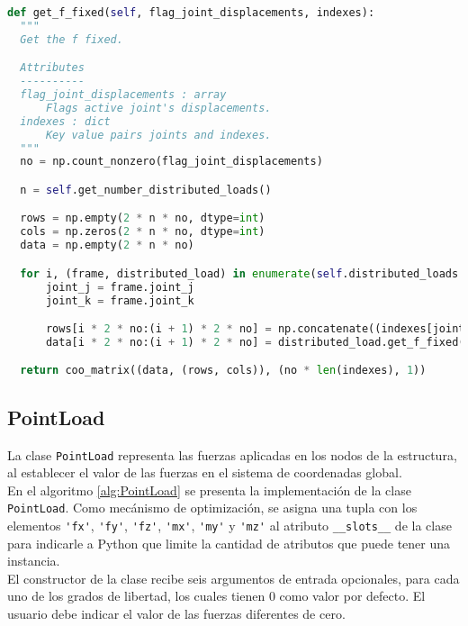 \begin{lstlisting}[language=Python,caption=Método \texttt{get\_f\_fixed()} de la clase \texttt{LoadPattern}.,label=alg:LoadPattern-get_f_fixed, frame=single]
def get_f_fixed(self, flag_joint_displacements, indexes):
  """
  Get the f fixed.

  Attributes
  ----------
  flag_joint_displacements : array
      Flags active joint's displacements.
  indexes : dict
      Key value pairs joints and indexes.
  """
  no = np.count_nonzero(flag_joint_displacements)

  n = self.get_number_distributed_loads()

  rows = np.empty(2 * n * no, dtype=int)
  cols = np.zeros(2 * n * no, dtype=int)
  data = np.empty(2 * n * no)

  for i, (frame, distributed_load) in enumerate(self.distributed_loads.items()):
      joint_j = frame.joint_j
      joint_k = frame.joint_k

      rows[i * 2 * no:(i + 1) * 2 * no] = np.concatenate((indexes[joint_j], indexes[joint_k]))
      data[i * 2 * no:(i + 1) * 2 * no] = distributed_load.get_f_fixed(flag_joint_displacements, frame)

  return coo_matrix((data, (rows, cols)), (no * len(indexes), 1))
\end{lstlisting}

\subsection{PointLoad}

La clase \verb|PointLoad| representa las fuerzas aplicadas en los nodos de la estructura, al establecer el valor de las fuerzas en el sistema de coordenadas global.\\

En el algoritmo \ref{alg:PointLoad} se presenta la implementación de la clase \verb|PointLoad|. Como mecánismo de optimización, se asigna una tupla con los elementos \verb|'fx'|, \verb|'fy'|, \verb|'fz'|, \verb|'mx'|, \verb|'my'| y \verb|'mz'| al atributo \verb|__slots__| de la clase para indicarle a Python que limite la cantidad de atributos que puede tener una instancia.\\

El constructor de la clase recibe seis argumentos de entrada opcionales, para cada uno de los grados de libertad, los cuales tienen 0 como valor por defecto. El usuario debe indicar el valor de las fuerzas diferentes de cero.\\

